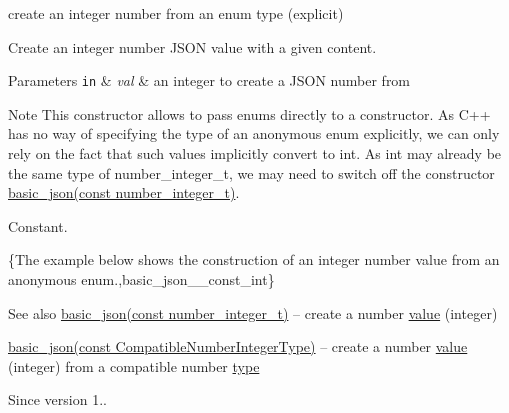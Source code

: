 create an integer number from an enum type (explicit) 

Create an integer number J\+S\+ON value with a given content.


\begin{DoxyParams}[1]{Parameters}
\mbox{\tt in}  & {\em val} & an integer to create a J\+S\+ON number from\\
\hline
\end{DoxyParams}
\begin{DoxyNote}{Note}
This constructor allows to pass enums directly to a constructor. As C++ has no way of specifying the type of an anonymous enum explicitly, we can only rely on the fact that such values implicitly convert to int. As int may already be the same type of number\+\_\+integer\+\_\+t, we may need to switch off the constructor \hyperlink{a00025_a0d838bc7ffca6017f51167e0a8ffd9b6}{basic\+\_\+json(const number\+\_\+integer\+\_\+t)}.
\end{DoxyNote}
Constant.

\{The example below shows the construction of an integer number value from an anonymous enum.,basic\+\_\+json\+\_\+\+\_\+const\+\_\+int\}

\begin{DoxySeeAlso}{See also}
\hyperlink{a00025_a0d838bc7ffca6017f51167e0a8ffd9b6}{basic\+\_\+json(const number\+\_\+integer\+\_\+t)} -- create a number \hyperlink{a00025_a0a2cbbd95862a623e7dc5c37e67dead0}{value} (integer) 

\hyperlink{a00025_ad2eddc2c13ab084f067eaba65d381ad2}{basic\+\_\+json(const Compatible\+Number\+Integer\+Type)} -- create a number \hyperlink{a00025_a0a2cbbd95862a623e7dc5c37e67dead0}{value} (integer) from a compatible number \hyperlink{a00025_a848cbae3bd3502ffbf738320bf5eb3aa}{type}
\end{DoxySeeAlso}
\begin{DoxySince}{Since}
version 1.. 
\end{DoxySince}
